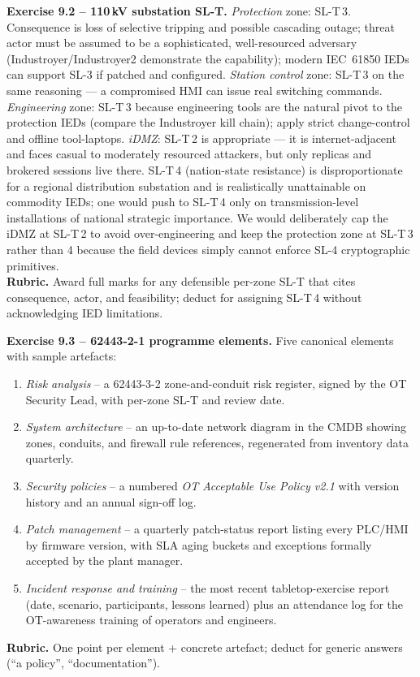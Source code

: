 \documentclass[11pt,a4paper]{article}
\begin{document}
\begin{solutionbox}
\textbf{Exercise 9.2 -- 110\,kV substation SL-T.}
\emph{Protection} zone: SL-T\,3. Consequence is loss of selective tripping and possible cascading outage; threat actor must be assumed to be a sophisticated, well-resourced adversary (Industroyer/Industroyer2 demonstrate the capability); modern IEC~61850 IEDs can support SL-3 if patched and configured. \emph{Station control} zone: SL-T\,3 on the same reasoning --- a compromised HMI can issue real switching commands. \emph{Engineering} zone: SL-T\,3 because engineering tools are the natural pivot to the protection IEDs (compare the Industroyer kill chain); apply strict change-control and offline tool-laptops. \emph{iDMZ}: SL-T\,2 is appropriate --- it is internet-adjacent and faces casual to moderately resourced attackers, but only replicas and brokered sessions live there. SL-T\,4 (nation-state resistance) is disproportionate for a regional distribution substation and is realistically unattainable on commodity IEDs; one would push to SL-T\,4 only on transmission-level installations of national strategic importance. We would deliberately cap the iDMZ at SL-T\,2 to avoid over-engineering and keep the protection zone at SL-T\,3 rather than 4 because the field devices simply cannot enforce SL-4 cryptographic primitives.
\\\textbf{Rubric.} Award full marks for any defensible per-zone SL-T that cites consequence, actor, and feasibility; deduct for assigning SL-T\,4 without acknowledging IED limitations.
\end{solutionbox}

\begin{solutionbox}
\textbf{Exercise 9.3 -- 62443-2-1 programme elements.}
Five canonical elements with sample artefacts:
\begin{enumerate}
  \item \emph{Risk analysis} -- a 62443-3-2 zone-and-conduit risk register, signed by the OT Security Lead, with per-zone SL-T and review date.
  \item \emph{System architecture} -- an up-to-date network diagram in the CMDB showing zones, conduits, and firewall rule references, regenerated from inventory data quarterly.
  \item \emph{Security policies} -- a numbered \emph{OT Acceptable Use Policy v2.1} with version history and an annual sign-off log.
  \item \emph{Patch management} -- a quarterly patch-status report listing every PLC/HMI by firmware version, with SLA aging buckets and exceptions formally accepted by the plant manager.
  \item \emph{Incident response and training} -- the most recent tabletop-exercise report (date, scenario, participants, lessons learned) plus an attendance log for the OT-awareness training of operators and engineers.
\end{enumerate}
\textbf{Rubric.} One point per element + concrete artefact; deduct for generic answers (``a policy'', ``documentation'').
\end{solutionbox}
\end{document}

